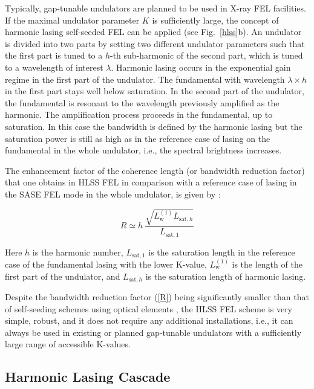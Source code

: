 \documentclass[aps,prl,preprint,groupedaddress,preprintnumbers]{revtex4}
\begin{document}
Typically, gap-tunable undulators are planned to be used in  X-ray FEL facilities. If the maximal undulator parameter $K$ is
sufficiently large, the concept of harmonic lasing self-seeded FEL can be applied (see Fig.~\ref{hlss}b).
An undulator is divided into two
parts by setting two different undulator parameters such that the first part is tuned to a $h$-th sub-harmonic
of the second part, which is tuned to a wavelength of interest $\lambda$.
Harmonic lasing occurs in the exponential gain regime in the first part of the
undulator. The fundamental with wavelength $\lambda \times h$
in the first part stays well below
saturation. In the second part of the undulator, the fundamental is resonant to the
wavelength previously amplified as the harmonic. The amplification
process proceeds in the fundamental, up to saturation. In this case the
bandwidth is defined by the harmonic lasing but the saturation power is
still as high as in the reference case of lasing on the fundamental in the whole undulator, i.e.,
the spectral brightness increases.

The enhancement factor of the coherence length (or bandwidth reduction factor) that one obtains in HLSS FEL in comparison with a
reference case of lasing in the SASE FEL mode in the whole undulator, is given by \cite{hlss}:


\begin{equation}
R \simeq h \ \frac{\sqrt{L_{\mathrm{w}}^{(1)} L_{\mathrm{sat},h}}}{L_{\mathrm{sat},1}}
\label{R}
\end{equation}

\noindent Here $h$ is the harmonic number, $L_{\mathrm{sat},1}$ is the saturation length in the reference case of
the fundamental lasing with the lower K-value, $L_{\mathrm{w}}^{(1)}$ is the length of the first part of the undulator,
and $L_{\mathrm{sat},h}$ is the saturation length of harmonic lasing.

Despite the bandwidth reduction factor (\ref{R}) being significantly smaller than that of self-seeding schemes using
optical elements \cite{ss-soft,ss-wake}, the HLSS FEL scheme is very simple, robust, and it does not require any additional installations,
i.e., it can always be used in existing or
planned gap-tunable undulators with a sufficiently large range of accessible K-values.

\subsection{Harmonic Lasing Cascade}
\end{document}
